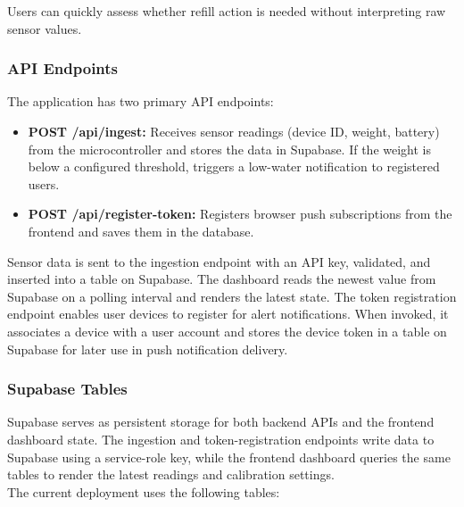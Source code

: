 \noindent Users can quickly assess whether refill action is needed without interpreting raw sensor values.

\subsubsection{API Endpoints}
The application has two primary API endpoints:

\begin{itemize}
    \item \textbf{POST /api/ingest:} Receives sensor readings (device ID, weight, battery) from the microcontroller and stores the data in Supabase. 
    If the weight is below a configured threshold, triggers a low-water notification to registered users.
    
    \item \textbf{POST /api/register-token:} Registers browser push subscriptions from the frontend and saves them in the database.
\end{itemize}

\noindent Sensor data is sent to the ingestion endpoint with an API key, validated, and inserted into a table on Supabase. The dashboard reads the newest 
value from Supabase on a polling interval and renders the latest state. The token registration endpoint enables user devices to register for alert notifications.
When invoked, it associates a device with a user account and stores the device token in a table on Supabase for later use in push notification delivery.

\subsubsection{Supabase Tables}
Supabase serves as persistent storage for both backend APIs and the frontend dashboard state. The ingestion and token-registration endpoints write data to
Supabase using a service-role key, while the frontend dashboard queries the same tables to render the latest readings and calibration settings.\\

\noindent The current deployment uses the following tables:

